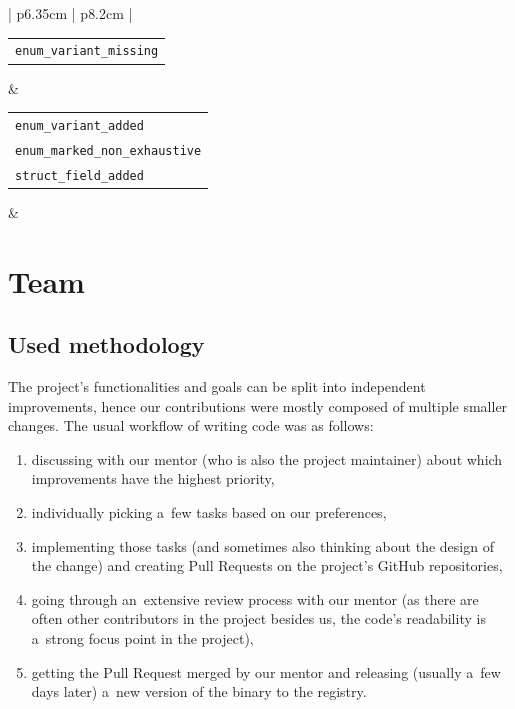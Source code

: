 \documentclass[licencjacka,en]{pracamgr}
\begin{document}
\begin{center}
\begin{longtable}{| p{6.35cm} | p{8.2cm} |}
\begin{tabular}[c]{@{}l@{}}
				\texttt{enum\_variant\_missing}
			\end{tabular} &
			 \\
		\hline
			\begin{tabular}[c]{@{}l@{}}
				\texttt{enum\_variant\_added} \\
				\texttt{enum\_marked\_non\_exhaustive} \\
				\texttt{struct\_field\_added}
			\end{tabular} &
			 \\
		\hline
	\end{longtable}
\end{center}

\chapter{Team}\label{r:chapter_team}

\section{Used methodology}\label{r:section_used_methodology}

The project's functionalities and goals can be split into independent improvements, hence our
contributions were mostly composed of multiple smaller changes. The usual workflow of writing
code was as follows:
\begin{enumerate}
	\item discussing with our mentor (who is also the project maintainer) about which improvements
		have the highest priority,
	\item individually picking a~few tasks based on our preferences,
	\item implementing those tasks (and sometimes also thinking about the design of the change)
		and creating Pull Requests on the project's GitHub repositories,
	\item going through an~extensive review process with our mentor (as there are often other
		contributors in the project besides us, the code's readability is a~strong focus point
		in the project),
	\item getting the Pull Request merged by our mentor and releasing (usually a~few days later)
		a~new version of the binary to the registry.
\end{enumerate}
\end{document}
